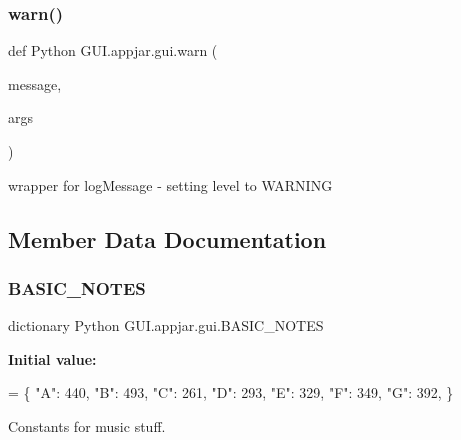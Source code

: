 \begin{DoxyVerb}
\subsubsection{\texorpdfstring{warn()}{warn()}}
{\footnotesize\ttfamily def Python G\+U\+I.\+appjar.\+gui.\+warn (\begin{DoxyParamCaption}\item[{}]{message,  }\item[{}]{args }\end{DoxyParamCaption})\hspace{0.3cm}{\ttfamily [static]}}

\begin{DoxyVerb}wrapper for logMessage - setting level to WARNING \end{DoxyVerb}
 

\subsection{Member Data Documentation}
\mbox{\label{class_python_01_g_u_i_1_1appjar_1_1gui_a9df72e79ccd23033bfaf086fdf330574}} 
\subsubsection{\texorpdfstring{B\+A\+S\+I\+C\+\_\+\+N\+O\+T\+ES}{BASIC\_NOTES}}
{\footnotesize\ttfamily dictionary Python G\+U\+I.\+appjar.\+gui.\+B\+A\+S\+I\+C\+\_\+\+N\+O\+T\+ES\hspace{0.3cm}{\ttfamily [static]}}

{\bfseries Initial value\+:}
\begin{DoxyCode}
=  \{
        \textcolor{stringliteral}{"A"}: 440,
        \textcolor{stringliteral}{"B"}: 493,
        \textcolor{stringliteral}{"C"}: 261,
        \textcolor{stringliteral}{"D"}: 293,
        \textcolor{stringliteral}{"E"}: 329,
        \textcolor{stringliteral}{"F"}: 349,
        \textcolor{stringliteral}{"G"}: 392,
    \}
\end{DoxyCode}


Constants for music stuff. 

\mbox{\label{class_python_01_g_u_i_1_1appjar_1_1gui_a8943ab001d8b781a2f0fcb999b3c2364}} 

\end{DoxyVerb}
